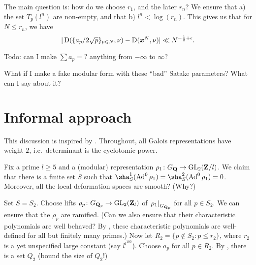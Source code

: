 The main question is: how do we choose $r_1$, and the later $r_n$? We ensure 
that a) the set $T_p(l^n)$ are non-empty, and that b) $l^n < \log(r_n)$. This 
gives us that for $N\leqslant r_n$, we have 
\[
	|\operatorname{D}(\{a_p / 2\sqrt p\}_{p\leqslant N}, \nu) - \operatorname{D}({\boldsymbol x}^N,\nu)| \ll N^{-\frac 1 2+\epsilon} .
\]

Todo: can I make $\sum a_p = ?$ anything from $-\infty$ to $\infty$?

What if I make a fake modular form with these ``bad'' Satake parameters? What 
can I say about it?





\section{Informal approach}

This discussion is inspired by \cite{pande-2011}. Throughout, all Galois 
representations have weight $2$, i.e.~determinant is the cyclotomic power. 

Fix a prime $l\geqslant 5$ and a (modular) representation 
$\rho_1\colon G_{\mathbf{Q}} \to \operatorname{GL}_2(\mathbf{Z}/l)$. We claim that there is a finite set 
$S$ such that $\sha_S^1(\Ad^0\rho_1) = \sha_S^2(\Ad^0 \rho_1) = 0$. Moreover, 
all the local deformation spaces are smooth? (Why?)

Set $S=S_2$. Choose lifts $\rho_p\colon G_{\mathbf{Q}_p} \to \operatorname{GL}_2(\mathbf{Z}_l)$ of 
$\left.\rho_1\right|_{G_{\mathbf{Q}_p}}$ for all $p\in S_2$. We can ensure that the 
$\rho_p$ are ramified. (Can we also ensure that their characteristic 
polynomials are well behaved? By \cite{khare-rajan-2001}, these 
characteristic polynomials are well-defined for all but finitely many primes.)
Now let $R_2 = \{p\notin S_2 : p\leqslant r_2\}$, where $r_2$ is a yet 
unspecified large constant (say $l^{l^{100}}$). Choose $a_p$ for all 
$p\in R_2$. By \cite[Lem.~5.1]{pande-2011}, there is a set $Q_2$ (bound the 
size of $Q_2$!) 
